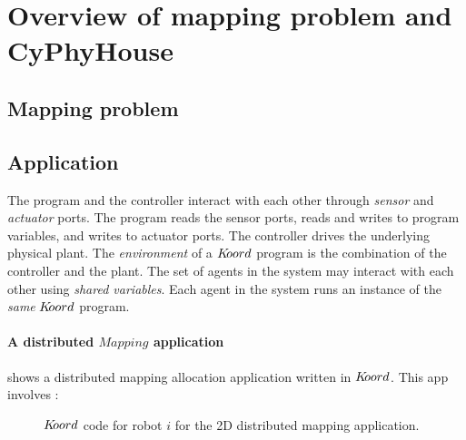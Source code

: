 \section{Overview of mapping problem and CyPhyHouse}
\label{sec:semantics}

\subsection{Mapping problem }

\subsection{\dmap Application}

The program and the controller interact with each other through {\em sensor} and {\em actuator} ports.  The program reads the sensor ports, reads and writes to program variables, and writes to actuator ports. The controller drives the underlying physical plant. The \emph{environment} of a  $K\kern-2pt oord$ program is the combination of the controller and the plant. The set of agents in the system may interact with each other using {\em shared variables\/}. Each agent in the system runs an instance of the \emph{same} $K\kern-2pt oord$ program. 

    
\paragraph* {A distributed $\mathit{Mapping}$  application}  shows a distributed mapping allocation application written in $K\kern-2pt oord$. This app involves :
\begin{figure}[!htbp]
    \noindent
    \begin{mdframed}

    \begin{center}
        \scriptsize
        {}
        {}
    \end{center}
    \end{mdframed}

    \caption{$K\kern-2pt oord$ code for robot $i$ for the 2D distributed mapping application. \vspace{-5mm}}
    \label{fig:mapapp}
\end{figure}



